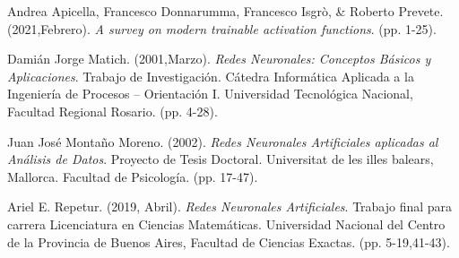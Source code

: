 \documentclass[12pt,a4paper]{article}
\begin{document}
\begin{sloppypar}
\begin{thebibliography}{9}
Andrea Apicella, Francesco Donnarumma, Francesco Isgrò, \& Roberto Prevete. (2021,Febrero). \textit{A survey on modern trainable activation functions}. (pp. 1-25).

Damián Jorge Matich. (2001,Marzo). \textit{Redes Neuronales: Conceptos Básicos y Aplicaciones}. Trabajo de Investigación. Cátedra Informática Aplicada a la Ingeniería de Procesos – Orientación I. Universidad Tecnológica Nacional, Facultad Regional Rosario. (pp. 4-28).

Juan José Montaño Moreno. (2002). \textit{Redes Neuronales Artificiales aplicadas al Análisis de Datos}. Proyecto de Tesis Doctoral. Universitat de les illes balears, Mallorca. Facultad de Psicología. (pp. 17-47).

Ariel E. Repetur. (2019, Abril). \textit{Redes Neuronales Artificiales}. Trabajo final para carrera {Licenciatura en Ciencias Matemáticas}. Universidad Nacional del Centro de la Provincia de Buenos Aires, Facultad de Ciencias Exactas. (pp. 5-19,41-43).


\end{thebibliography}

\end{sloppypar}
\end{document}
